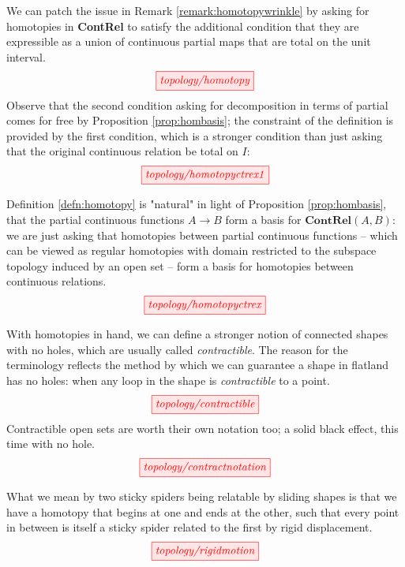 \begin{myboxB}
\begin{defn}\label{defn:homotopy}
We can patch the issue in Remark \ref{remark:homotopywrinkle} by asking for homotopies in \textbf{ContRel} to satisfy the additional condition that they are expressible as a union of continuous partial maps that are total on the unit interval.
\[\tikzfig{topology/homotopy}\]
Observe that the second condition asking for decomposition in terms of partial comes for free by Proposition \ref{prop:hombasis}; the constraint of the definition is provided by the first condition, which is a stronger condition than just asking that the original continuous relation be total on $I$:
\[\tikzfig{topology/homotopyctrex1}\]
\end{defn}
\end{myboxB}

\begin{myboxR}
\begin{remark}
Definition \ref{defn:homotopy} is "natural" in light of Proposition \ref{prop:hombasis}, that the partial continuous functions $A \rightarrow B$ form a basis for $\mathbf{ContRel}(A,B)$: we are just asking that homotopies between partial continuous functions -- which can be viewed as regular homotopies with domain restricted to the subspace topology induced by an open set -- form a basis for homotopies between continuous relations.
\[\tikzfig{topology/homotopyctrex}\]
\end{remark}
\end{myboxR}

\begin{myboxB}
\begin{defn}[Contractibility]\label{defn:contractible}
With homotopies in hand, we can define a stronger notion of connected shapes with no holes, which are usually called \emph{contractible}. The reason for the terminology reflects the method by which we can guarantee a shape in flatland has no holes: when any loop in the shape is \emph{contractible} to a point.
\[\tikzfig{topology/contractible}\]
Contractible open sets are worth their own notation too; a solid black effect, this time with no hole.
\[\tikzfig{topology/contractnotation}\]
\end{defn}
\end{myboxB}

\begin{myboxR}
\begin{defn}\label{defn:sliding}
What we mean by two sticky spiders being relatable by sliding shapes is that we have a homotopy that begins at one and ends at the other, such that every point in between is itself a sticky spider related to the first by rigid displacement.
\[\tikzfig{topology/rigidmotion}\]
\end{defn}
\end{myboxR}

